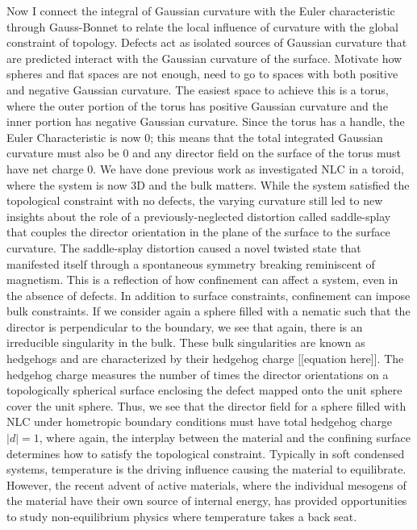 Now I connect the integral of Gaussian curvature with the Euler characteristic through Gauss-Bonnet to relate the local influence of curvature with the global constraint of topology.
Defects act as isolated sources of Gaussian curvature that are predicted interact with the Gaussian curvature of the surface.
Motivate how spheres and flat spaces are not enough, need to go to spaces with both positive and negative Gaussian curvature.
The easiest space to achieve this is a torus, where the outer portion of the torus has positive Gaussian curvature and the inner portion has negative Gaussian curvature.
Since the torus has a handle, the Euler Characteristic is now 0; this means that the total integrated Gaussian curvature must also be 0 and any director field on the surface of the torus must have net charge 0.
We have done previous work as investigated NLC in a toroid, where the system is now 3D and the bulk matters.
While the system satisfied the topological constraint with no defects, the varying curvature still led to new insights about the role of a previously-neglected distortion called saddle-splay that couples the director orientation in the plane of the surface to the surface curvature.
The saddle-splay distortion caused a novel twisted state that manifested itself through a spontaneous symmetry breaking reminiscent of magnetism.
This is a reflection of how confinement can affect a system, even in the absence of defects.
In addition to surface constraints, confinement can impose bulk constraints.
If we consider again a sphere filled with a nematic such that the director is perpendicular to the boundary, we see that again, there is an irreducible singularity in the bulk.
These bulk singularities are known as hedgehogs and are characterized by their hedgehog charge [[equation here]].
The hedgehog charge measures the number of times the director orientations on a topologically spherical surface enclosing the defect mapped onto the unit sphere cover the unit sphere.
Thus, we see that the director field for a sphere filled with NLC under hometropic boundary conditions must have total hedgehog charge $|d| = 1$, where again, the interplay between the material and the confining surface determines how to satisfy the topological constraint.
Typically in soft condensed systems, temperature is the driving influence causing the material to equilibrate.
However, the recent advent of active materials, where the individual mesogens of the material have their own source of internal energy, has provided opportunities to study non-equilibrium physics where temperature takes a back seat.
